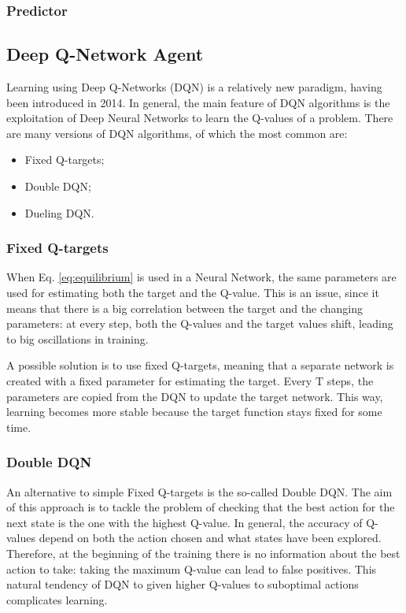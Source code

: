 \documentclass[a4paper, 12pt]{article}
\numberwithin{equation}{section}
\begin{document}
\subsubsection{Predictor}


\subsection[Deep Q-Network Agent]{Deep Q-Network Agent \cite{improvements}}

Learning using Deep Q-Networks (DQN) is a relatively new paradigm, having been introduced in 2014. In general, the main feature of DQN algorithms is the exploitation of Deep Neural Networks to learn the Q-values of a problem. There are many versions of DQN algorithms, of which the most common are:
\begin{itemize}
	\item Fixed Q-targets;
	\item Double DQN;
	\item Dueling DQN.
\end{itemize}


\subsubsection{Fixed Q-targets}

When Eq. \eqref{eq:equilibrium} is used in a Neural Network, the same parameters are used for estimating both the target and the Q-value. This is an issue, since it means that there is a big correlation between the target and the changing parameters: at every step, both the Q-values and the target values shift, leading to big oscillations in training.

A possible solution is to use fixed Q-targets, meaning that a separate network is created with a fixed parameter for estimating the target. Every $\mathrm{T}$ steps, the parameters are copied from the DQN to update the target network. This way, learning becomes more stable because the target function stays fixed for some time.

\subsubsection{Double DQN}

An alternative to simple Fixed Q-targets is the so-called Double DQN. The aim of this approach is to tackle the problem of checking that the best action for the next state is the one with the highest Q-value. In general, the accuracy of Q-values depend on both the action chosen and what states have been explored. Therefore, at the beginning of the training there is no information about the best action to take: taking the maximum Q-value can lead to false positives. This natural tendency of DQN to given higher Q-values to suboptimal actions complicates learning.
\end{document}
